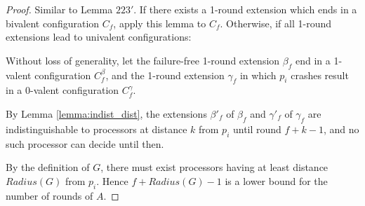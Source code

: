 \begin{proof}

Similar to Lemma $223'$.
If there exists a 1-round extension which ends in a bivalent configuration $C_f$,
apply this lemma to $C_f$. Otherwise, if all 1-round extensions lead to univalent
configurations:

Without loss of generality, let the failure-free 1-round extension $\beta_f$
end in a 1-valent configuration $C^\beta_f$, and the 1-round extension $\gamma_f$ in which
$p_i$ crashes result in a 0-valent configuration $C^\gamma_f$.

By Lemma \ref{lemma:indist_dist}, the extensions $\beta'_f$ of $\beta_f$ and 
$\gamma'_f$ of $\gamma_f$ are indistinguishable to processors at distance $k$
from $p_i$ until round $f+k-1$, and no such processor can decide
until then.

By the definition of $G$, there must exist processors having at least distance
$Radius(G)$ from $p_i$. Hence $f+Radius(G)-1$ is a lower bound for the number
of rounds of $A$.
\end{proof}

